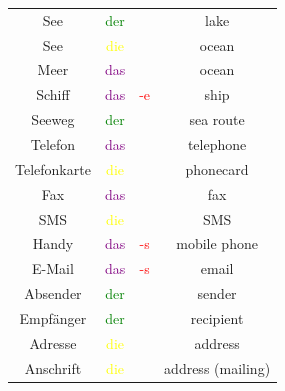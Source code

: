 \begin{center}
\begin{tabular}{|c|c|c|c|}
        \hline
        See                   & \textcolor{green}{der}  &                                          & lake                    \\
        See                   & \textcolor{yellow}{die} &                                          & ocean                   \\
        Meer                  & \textcolor{purple}{das} &                                          & ocean                   \\
        Schiff                & \textcolor{purple}{das} & \textcolor{red}{-e}                      & ship                    \\
        Seeweg                & \textcolor{green}{der}  &                                          & sea route               \\
        \hline
        \hline
        Telefon               & \textcolor{purple}{das} &                                          & telephone               \\
        Telefonkarte          & \textcolor{yellow}{die} &                                          & phonecard               \\
        \hline
        Fax                   & \textcolor{purple}{das} &                                          & fax                     \\
        SMS                   & \textcolor{yellow}{die} &                                          & SMS                     \\
        \hline
        Handy                 & \textcolor{purple}{das} & \textcolor{red}{-s}                      & mobile phone            \\
        E-Mail                & \textcolor{purple}{das} & \textcolor{red}{-s}                      & email                   \\
        \hline
        Absender              & \textcolor{green}{der}  &                                          & sender                  \\
        Empfänger             & \textcolor{green}{der}  &                                          & recipient               \\
        \hline
        Adresse               & \textcolor{yellow}{die} &                                          & address                 \\
        Anschrift             & \textcolor{yellow}{die} &                                          & address (mailing)       \\

\end{tabular}
\end{center}
